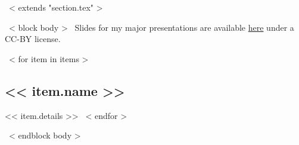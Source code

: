 ~< extends "section.tex" >~

~< block body >~
Slides for my major presentations are available
\href{https://colefaraday.github.io/home/talks/}{here}
under a CC-BY license.

~< for item in items >~
	\subsection{<< item.name >>}
	<< item.details >>
~< endfor >~


~< endblock body >~
